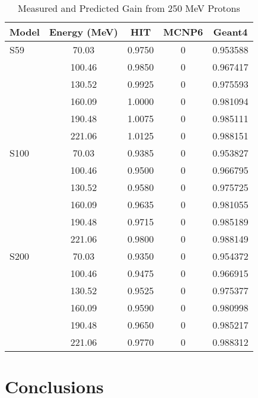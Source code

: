 \documentclass{mc2015}
\begin{document}
\lipsum[7]
\begin{table}
  \centering
  \caption{Measured and Predicted Gain from 250 MeV Protons}
  \begin{tabular}{lcccc}
    \toprule
    Model & Energy (MeV) & HIT & MCNP6 & Geant4 \\
    \midrule
    S59 & 70.03  & \num{0.9750} & \num{0} & \num{0.953588} \\
        & 100.46 & \num{0.9850} & \num{0} & \num{0.967417} \\
        & 130.52 & \num{0.9925} & \num{0} & \num{0.975593} \\
        & 160.09 & \num{1.0000} & \num{0} & \num{0.981094} \\
        & 190.48 & \num{1.0075} & \num{0} & \num{0.985111} \\
        & 221.06 & \num{1.0125} & \num{0} & \num{0.988151} \\
    \midrule
    S100 & 70.03 & \num{0.9385} & \num{0} & \num{0.953827} \\
        & 100.46 & \num{0.9500} & \num{0} & \num{0.966795} \\
        & 130.52 & \num{0.9580} & \num{0} & \num{0.975725} \\
        & 160.09 & \num{0.9635} & \num{0} & \num{0.981055} \\
        & 190.48 & \num{0.9715} & \num{0} & \num{0.985189} \\
        & 221.06 & \num{0.9800} & \num{0} & \num{0.988149} \\
    \midrule
    S200 & 70.03 & \num{0.9350} & \num{0} & \num{0.954372} \\
        & 100.46 & \num{0.9475} & \num{0} & \num{0.966915} \\
        & 130.52 & \num{0.9525} & \num{0} & \num{0.975377} \\
        & 160.09 & \num{0.9590} & \num{0} & \num{0.980998} \\
        & 190.48 & \num{0.9650} & \num{0} & \num{0.985217} \\
        & 221.06 & \num{0.9770} & \num{0} & \num{0.988312} \\
    \bottomrule
  \end{tabular}
  \label{tab:sample}
\end{table}


\section{Conclusions}
\end{document}
